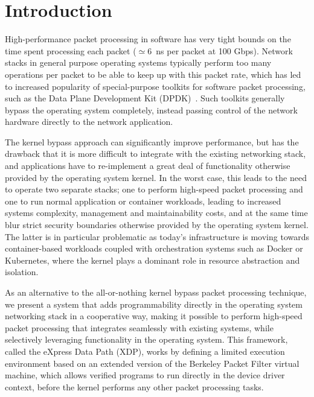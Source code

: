 \documentclass[10pt,sigconf]{acmart}
\begin{document}

\maketitle

\section{Introduction}%
\label{sec:introduction}
High-performance packet processing in software has very tight bounds on the time
spent processing each packet ($\simeq6$~ns per packet at 100 Gbps). Network
stacks in general purpose operating systems typically perform too many
operations per packet to be able to keep up with this packet rate, which has led
to increased popularity of special-purpose toolkits for software packet
processing, such as the Data Plane Development Kit (DPDK)~\cite{dpdk}. Such
toolkits generally bypass the operating system completely, instead passing
control of the network hardware directly to the network application.

The kernel bypass approach can significantly improve performance, but has the
drawback that it is more difficult to integrate with the existing networking
stack, and applications have to re-implement a great deal of functionality
otherwise provided by the operating system kernel. In the worst case, this leads
to the need to operate two separate stacks; one to perform high-speed packet
processing and one to run normal application or container workloads, leading to
increased systems complexity, management and maintainability costs, and at the
same time blur strict security boundaries otherwise provided by the operating
system kernel. The latter is in particular problematic as today's infrastructure
is moving towards container-based workloads coupled with orchestration systems
such as Docker or Kubernetes, where the kernel plays a dominant role in resource
abstraction and isolation.

As an alternative to the all-or-nothing kernel bypass packet processing
technique, we present a system that adds programmability directly in the
operating system networking stack in a cooperative way, making it possible to
perform high-speed packet processing that integrates seamlessly with existing
systems, while selectively leveraging functionality in the operating system.
This framework, called the eXpress Data Path (XDP), works by defining a limited
execution environment based on an extended version of the Berkeley Packet Filter
virtual machine, which allows verified programs to run directly in the device
driver context, before the kernel performs any other packet processing tasks.
\end{document}
